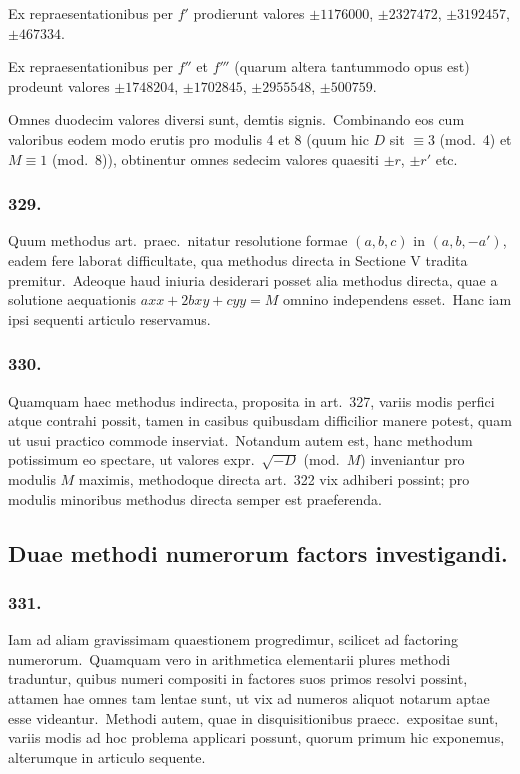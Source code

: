 \documentclass[12pt,a4paper]{article}
\theoremstyle{plain}
\theoremstyle{definition}
\theoremstyle{remark}
\begin{document}
Ex repraesentationibus per $f'$ prodierunt valores $\pm 1176000$,
$\pm 2327472$, $\pm 3192457$, $\pm 467334$.

Ex repraesentationibus per $f''$ et $f'''$ (quarum altera tantummodo opus
est) prodeunt valores $\pm 1748204$, $\pm 1702845$, $\pm 2955548$, $\pm 500759$.

Omnes duodecim valores diversi sunt, demtis signis.\ Combinando eos
cum valoribus eodem modo erutis pro modulis 4 et 8 (quum hic $D$ sit
$\equiv 3$ (mod.\ 4) et $M\equiv 1$ (mod.\ 8)), obtinentur omnes sedecim valores
quaesiti $\pm r$, $\pm r'$ etc.

\subsubsection*{329.}

Quum methodus art.\ praec.\ nitatur resolutione formae $(a,b,c)$ in
 $(a,b,-a')$, eadem fere laborat difficultate, qua methodus directa in
Sectione V tradita premitur.\ Adeoque haud iniuria desiderari posset alia
methodus directa, quae a solutione aequationis $axx+2bxy+cyy=M$
omnino independens esset.\ Hanc iam ipsi sequenti articulo reservamus.

\subsubsection*{330.}

Quamquam haec methodus indirecta, proposita in art.\ 327, variis
modis perfici atque contrahi possit, tamen in casibus quibusdam difficilior
manere potest, quam ut usui practico commode inserviat.\ Notandum autem
est, hanc methodum potissimum eo spectare, ut valores expr.\ $\sqrt{-D}$ (mod.\ $M$)
inveniantur pro modulis $M$ maximis, methodoque directa art.\ 322 vix
adhiberi possint; pro modulis minoribus methodus directa semper est
praeferenda.

\subsection*{Duae methodi numerorum factors investigandi.}

\subsubsection*{331.}

Iam ad aliam gravissimam quaestionem progredimur, scilicet ad
factoring numerorum.\ Quamquam vero in arithmetica elementarii plures
methodi traduntur, quibus numeri compositi in factores suos primos resolvi
possint, attamen hae omnes tam lentae sunt, ut vix ad numeros aliquot
notarum aptae esse videantur.\ Methodi autem, quae in disquisitionibus
praecc.\ expositae sunt, variis modis ad hoc problema applicari possunt,
quorum primum hic exponemus, alterumque in articulo sequente.
\end{document}

